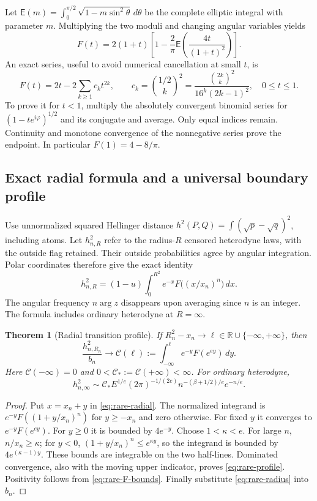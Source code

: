 \documentclass[11pt,a4paper]{article}
\newtheorem{theorem}{Theorem}[section]\newtheorem{proposition}[theorem]{Proposition}\newtheorem{corollary}[theorem]{Corollary}\newtheorem{lemma}[theorem]{Lemma}\newtheorem{remark}[theorem]{Remark}
\numberwithin{equation}{section}
\begin{document}
Let $\mathsf E(m)=\int_0^{\pi/2}\sqrt{1-m\sin^2\theta}\,d\theta$
be the complete elliptic integral with parameter $m$. Multiplying the two
moduli and changing angular variables yields
\[
 F(t)=2(1+t)\left[1-\frac2\pi\mathsf E\!\left(
                      \frac{4t}{(1+t)^2}\right)\right].
 \tag{C.5}\label{eq:rare-elliptic}
\]
An exact series, useful to avoid numerical cancellation at small $t$, is
\[
 F(t)=2t-2\sum_{k\ge1}c_kt^{2k},\qquad
 c_k=\binom{1/2}{k}^{\!2}
 =\frac{\binom{2k}{k}^2}{16^k(2k-1)^2},\quad 0\le t\le1.
 \tag{C.6}\label{eq:rare-series}
\]
To prove it for $t<1$, multiply the absolutely convergent binomial series for
$(1-te^{i\varphi})^{1/2}$ and its conjugate and average. Only equal indices
remain. Continuity and monotone convergence of the nonnegative series prove
the endpoint. In particular $F(1)=4-8/\pi$.

\subsection{Exact radial formula and a universal boundary profile}
Use unnormalized squared Hellinger distance
$h^2(P,Q)=\int(\sqrt p-\sqrt q)^2$, including atoms.
Let $h_{n,R}^2$ refer to the radius-$R$ censored heterodyne laws, with the
outside flag retained. Their outside probabilities agree by angular
integration. Polar coordinates therefore give the exact identity
\[
 \boxed{h_{n,R}^2=(1-u)\int_0^{R^2}e^{-x}
                           F\bigl((x/x_n)^n\bigr)\,dx.}
 \tag{C.7}\label{eq:rare-radial}
\]
The angular frequency $n\arg z$ disappears upon averaging since $n$ is an
integer. The formula includes ordinary heterodyne at $R=\infty$.

\begin{theorem}[Radial transition profile]\label{thm:rare-profile}
If $R_n^2-x_n\to\ell\in\mathbb R\cup\{-\infty,+\infty\}$, then
\[
 \frac{h_{n,R_n}^2}{b_n}\longrightarrow
 \mathcal C(\ell):=\int_{-\infty}^{\ell}e^{-y}F(e^{ey})\,dy.
 \tag{C.8}\label{eq:rare-profile}
\]
Here $\mathcal C(-\infty)=0$ and $0<\mathcal C_*:=\mathcal C(+\infty)<\infty$.
For ordinary heterodyne,
\[
 h_{n,\infty}^2\sim\mathcal C_* E^{1/e}(2\pi)^{-1/(2e)}
 n^{-(\beta+1/2)/e}e^{-n/e}.
 \tag{C.9}\label{eq:rare-sharp}
\]
\end{theorem}
\begin{proof}
Put $x=x_n+y$ in \eqref{eq:rare-radial}. The normalized integrand is
$e^{-y}F((1+y/x_n)^n)$ for $y\ge-x_n$ and zero otherwise.
For fixed $y$ it converges to $e^{-y}F(e^{ey})$.
For $y\ge0$ it is bounded by $4e^{-y}$.
Choose $1<\kappa<e$. For large $n$, $n/x_n\ge\kappa$; for $y<0$,
$(1+y/x_n)^n\le e^{\kappa y}$, so the integrand is bounded by
$4e^{(\kappa-1)y}$. These bounds are integrable on the two half-lines.
Dominated convergence, also with the moving upper indicator, proves
\eqref{eq:rare-profile}. Positivity follows from \eqref{eq:rare-F-bounds}.
Finally substitute \eqref{eq:rare-radius} into $b_n$.
\end{proof}
\end{document}

